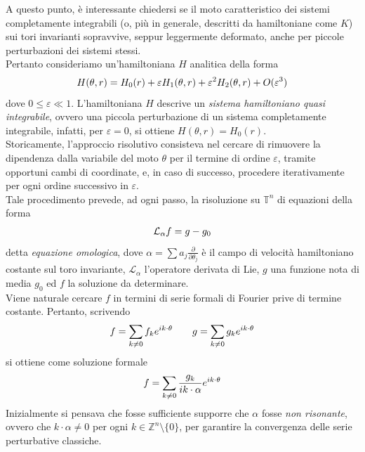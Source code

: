 \documentclass[twoside, 11pt]{amsbook}
\newcommand{\0}{{(0)}}
\newcommand{\3}{{(3)}}
\theoremstyle{colonplain}
\theoremstyle{colondefinition}
\theoremstyle{colonremark}
\numberwithin{equation}{chapter}
\begin{document}
A questo punto, è interessante chiedersi se il moto caratteristico dei sistemi completamente integrabili (o, più in generale, descritti da hamiltoniane come $K$) sui tori invarianti sopravvive, seppur leggermente deformato, anche per piccole perturbazioni dei sistemi stessi. \\
Pertanto consideriamo un'hamiltoniana $H$ analitica della forma
\begin{align}
    H(\theta, r) = H_0(r) + \varepsilon H_1(\theta, r) + \varepsilon^2H_2(\theta, r) + O(\varepsilon^3) \notag 
\end{align}
dove $0 \leq \varepsilon \ll 1$. L'hamiltoniana $H$ descrive un \textit{sistema hamiltoniano quasi integrabile}, ovvero una piccola perturbazione di un sistema completamente integrabile, infatti, per $\varepsilon = 0$, si ottiene $H(\theta, r) = H_0(r)$. \\
Storicamente, l'approccio risolutivo consisteva nel cercare di rimuovere la dipendenza dalla variabile del moto $\theta$ per il termine di ordine $\varepsilon$, tramite opportuni cambi di coordinate, e, in caso di successo, procedere iterativamente per ogni ordine successivo in $\varepsilon$. \\
Tale procedimento prevede, ad ogni passo, la risoluzione su $\mathbb{T}^n$ di equazioni della forma
\begin{align}
    \mathcal{L}_\alpha f = g - g_0 \notag 
\end{align}
detta \textit{equazione omologica}, dove $\alpha = \sum a_j\frac{\partial}{\partial \theta_j}$ è il campo di velocità hamiltoniano costante sul toro invariante, $\mathcal{L}_\alpha$ l'operatore derivata di Lie, $g$ una funzione nota di media $g_0$ ed $f$ la soluzione da determinare. \\ 
Viene naturale cercare $f$ in termini di serie formali di Fourier prive di termine costante. Pertanto, scrivendo
\begin{align}
    f = \sum_{k \neq 0} f_k e^{ik \cdot \theta} \qquad g = \sum_{k \neq 0} g_k e^{ik \cdot \theta} \notag 
\end{align}
si ottiene come soluzione formale
\begin{align}
    f = \sum_{k \neq 0} \frac{g_k}{ik \cdot \alpha} e^{ik \cdot \theta} \notag 
\end{align}
Inizialmente si pensava che fosse sufficiente supporre che $\alpha$ fosse \textit{non risonante}, ovvero che $k \cdot \alpha \neq 0$ per ogni $k \in \mathbb{Z}^n \setminus \{0\}$, per garantire la convergenza delle serie perturbative classiche. \\
\end{document}
